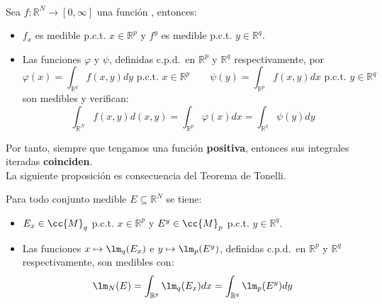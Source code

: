 \begin{teo}\ \\
    Sea $f:\mathbb{R}^N\to [0,\infty]$ una función , entonces:
    \begin{itemize}
        \item $f_x$ es medible p.c.t. $x\in \mathbb{R}^p$ y $f^y$ es medible p.c.t. $y\in \mathbb{R}^q$.
        \item Las funciones $\varphi$ y $\psi$, definidas c.p.d.\ en $\mathbb{R}^p$ y $\mathbb{R}^q$ respectivamente, por
            \begin{equation*}
                \varphi(x)=\int_{\mathbb{R}^q} f(x,y)dy \text{\ p.c.t.\ }x\in \mathbb{R}^p \qquad \psi(y) = \int_{\mathbb{R}^p} f(x,y)dx \text{\ p.c.t.\ } y \in \mathbb{R}^q
            \end{equation*}
            son medibles y verifican:
            \begin{equation*}
                \int_{\mathbb{R}^N}f(x,y)d(x,y) = \int_{\mathbb{R}^p}\varphi(x)dx = \int_{\mathbb{R}^q}\psi(y)dy
            \end{equation*}
    \end{itemize}
\end{teo}

Por tanto, siempre que tengamos una función \textbf{positiva}, entonces sus integrales iteradas \textbf{coinciden}.\\

La siguiente proposición es consecuencia del Teorema de Tonelli.

\begin{prop}
    Para todo conjunto medible $E\subseteq \mathbb{R}^N$ se tiene:
    \begin{itemize}
        \item $E_x \in \cc{M}_q$ p.c.t. $x\in \mathbb{R}^p$ y $E^y\in \cc{M}_p$ p.c.t. $y\in \mathbb{R}^q$.
        \item Las funciones $x\mapsto \lm_q(E_x)$ e $y\mapsto \lm_p(E^y)$, definidas c.p.d.\ en $\mathbb{R}^p$ y $\mathbb{R}^q$ respectivamente, son medibles con:
            \begin{equation*}
                \lm_N(E) = \int_{\mathbb{R}^p} \lm_q(E_x)dx = \int_{\mathbb{R}^q} \lm_p(E^y)dy
            \end{equation*}
    \end{itemize}
\end{prop}

